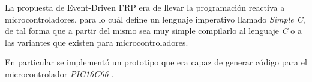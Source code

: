  La propuesta de Event-Driven FRP era de llevar la programación reactiva
a microcontroladores, para lo cuál define un lenguaje imperativo llamado
\textit{Simple C}, de tal forma que a partir del mismo sea muy simple
compilarlo al lenguaje \textit{C} o a las variantes que existen para 
microcontroladores.

  En particular se implementó un prototipo que era capaz de generar
código para el microcontrolador \textit{PIC16C66} \cite{microchip}.

